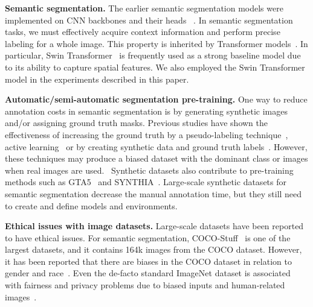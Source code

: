 \documentclass[10pt,twocolumn,letterpaper]{article}
\begin{document}
\noindent \textbf{Semantic segmentation.} %
The earlier semantic segmentation models were implemented on CNN backbones and their heads ~\cite{7298965, https://doi.org/10.48550/arxiv.1505.07293, https://doi.org/10.48550/arxiv.1505.04597, 10.1007/978-3-030-01234-2_49, https://doi.org/10.48550/arxiv.1703.06870}. In semantic segmentation tasks, we must effectively acquire context information and perform precise labeling for a whole image. This property is inherited by Transformer models~\cite{vaswani2017attention, xie2021segformer,jain2021semask, liu2021Swin}. In particular, Swin Transformer~\cite{liu2021Swin} is frequently used as a strong baseline model due to its ability to capture spatial features. We also employed the Swin Transformer model in the experiments described in this paper. 

\noindent \textbf{Automatic/semi-automatic segmentation pre-training.}
One way to reduce annotation costs in semantic segmentation is by generating synthetic images and/or assigning ground truth masks. Previous studies have shown the effectiveness of increasing the ground truth by a pseudo-labeling technique~\cite{Zou_2019_ICCV, zou2018unsupervised,shin2020two,zheng2021rectifying,Li2019BidirectionalLF}, active learning~\cite{xie2022ripu,9156651,Qiao_Zhu_Long_Zhang_Wang_Du_Yang_2022} or by creating synthetic data and ground truth labels~\cite{semanticGAN}. However, these techniques may produce a biased dataset with the dominant class or images when real images are used.  Synthetic datasets also contribute to pre-training methods such as GTA5~\cite{Richter_2016_ECCV} and SYNTHIA~\cite{Ros_2016_CVPR}. Large-scale synthetic datasets for semantic segmentation decrease the manual annotation time, but they still need to create and define models and environments.

\noindent \textbf{Ethical issues with image datasets.} Large-scale datasets have been reported to have ethical issues. For semantic segmentation, COCO-Stuff~\cite{https://doi.org/10.48550/arxiv.1612.03716} is one of the largest datasets, and it contains 164k images from the COCO dataset. However, it has been reported that there are biases in the COCO dataset in relation to gender and race~\cite{zhao2021captionbias,wang2019iccv}. Even the de-facto standard ImageNet dataset is associated with fairness and privacy problems due to biased inputs and human-related images~\cite{Prabhu2021LargeID,Yang_2020}. 
\end{document}
